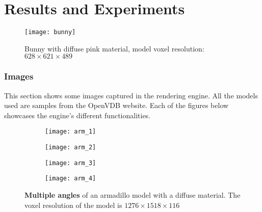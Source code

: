 
\part{Results and Experiments}\label{results}

\begin{figure}[H]
  \centering
  \texttt{[image: bunny]}
  \caption[Diffuse pink bunny model]{Bunny with diffuse pink material, model voxel resolution: $628\times621\times489$}
\end{figure}

\section{Images}

This section shows some images captured in the rendering engine. All the models used are samples from the OpenVDB website\supercite{openvdb:models}. Each of the figures below showcases the engine's different functionalities.

\begin{figure}[H]
  \centering
  \begin{subfigure}[b]{0.48\textwidth}
    \texttt{[image: arm\_1]}
  \end{subfigure}
  \hfill
  \begin{subfigure}[b]{0.48\textwidth}
    \texttt{[image: arm\_2]}
  \end{subfigure}
  \begin{subfigure}[b]{0.48\textwidth}
    \texttt{[image: arm\_3]}
  \end{subfigure}
  \hfill
  \begin{subfigure}[b]{0.48\textwidth}
    \texttt{[image: arm\_4]}
  \end{subfigure}
  \caption[Armadillo model]{\textbf{Multiple angles} of an armadillo model with a diffuse material. The voxel resolution of the model is $1276\times1518\times116$}
\end{figure}

